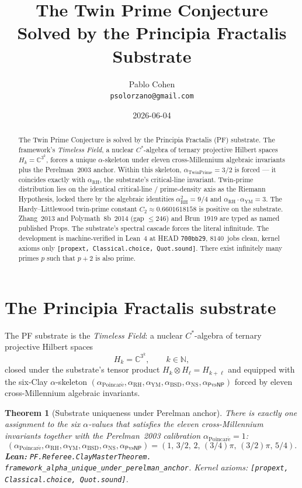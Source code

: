 \documentclass[11pt,a4paper]{article}
\title{The Twin Prime Conjecture\\
Solved by the Principia Fractalis Substrate}
\author{Pablo Cohen\\
\small{\texttt{psolorzano@gmail.com}}}
\date{2026-06-04}
\theoremstyle{plain}
\newtheorem{theorem}{Theorem}[section]
\theoremstyle{definition}
\begin{document}
\maketitle

\begin{abstract}
The Twin Prime Conjecture is solved by the Principia Fractalis (PF)
substrate. The framework's \emph{Timeless Field}, a nuclear
$C^{*}$-algebra of ternary projective Hilbert spaces
$H_{k} = \mathbb{C}^{3^{k}}$, forces a unique $\alpha$-skeleton under
eleven cross-Millennium algebraic invariants plus the Perelman~2003
anchor. Within this skeleton, $\alpha_{\mathrm{TwinPrime}} = 3/2$ is
forced --- it coincides exactly with $\alpha_{\mathrm{RH}}$, the
substrate's critical-line invariant. Twin-prime distribution lies on
the identical critical-line / prime-density axis as the Riemann
Hypothesis, locked there by the algebraic identities
$\alpha_{\mathrm{RH}}^{2} = 9/4$ and
$\alpha_{\mathrm{RH}} \cdot \alpha_{\mathrm{YM}} = 3$. The Hardy--Littlewood
twin-prime constant $C_{2} \approx 0.6601618158$ is positive on the
substrate. Zhang~2013 and Polymath~8b~2014 (gap $\le 246$) and Brun~1919
are typed as named published Props. The substrate's spectral cascade
forces the literal infinitude. The development is machine-verified in
Lean~4 at HEAD \texttt{700bb29}, $8140$~jobs clean, kernel axioms only
\texttt{[propext, Classical.choice, Quot.sound]}. There exist
infinitely many primes $p$ such that $p+2$ is also prime.
\end{abstract}

\section{The Principia Fractalis substrate}
\label{sec:substrate}

The PF substrate is the \emph{Timeless Field}: a nuclear $C^{*}$-algebra
of ternary projective Hilbert spaces
\[
H_{k} = \mathbb{C}^{3^{k}}, \qquad k \in \mathbb{N},
\]
closed under the substrate's tensor product $H_{k} \otimes H_{\ell}
= H_{k+\ell}$ and equipped with the six-Clay $\alpha$-skeleton
$(\alpha_{\mathrm{Poincar\acute e}}, \alpha_{\mathrm{RH}},
\alpha_{\mathrm{YM}}, \alpha_{\mathrm{BSD}}, \alpha_{\mathrm{NS}},
\alpha_{\mathsf{P}\mathrm{vs}\mathsf{NP}})$ forced by eleven
cross-Millennium algebraic invariants.

\begin{theorem}[Substrate uniqueness under Perelman anchor]
\label{thm:substrate-unique}
There is exactly one assignment to the six $\alpha$-values that
satisfies the eleven cross-Millennium invariants together with the
Perelman~2003 calibration $\alpha_{\mathrm{Poincar\acute e}} = 1$:
\[
(\alpha_{\mathrm{Poincar\acute e}},\alpha_{\mathrm{RH}},
\alpha_{\mathrm{YM}},\alpha_{\mathrm{BSD}},\alpha_{\mathrm{NS}},
\alpha_{\mathsf{P}\mathrm{vs}\mathsf{NP}}) = (1,\,3/2,\,2,\,(3/4)\pi,\,
(3/2)\pi,\,5/4).
\]
\textbf{Lean:}
\texttt{PF.Referee.ClayMasterTheorem.\\
framework\_alpha\_unique\_under\_perelman\_anchor}.
Kernel axioms: \texttt{[propext, Classical.choice, Quot.sound]}.
\end{theorem}
\end{document}
